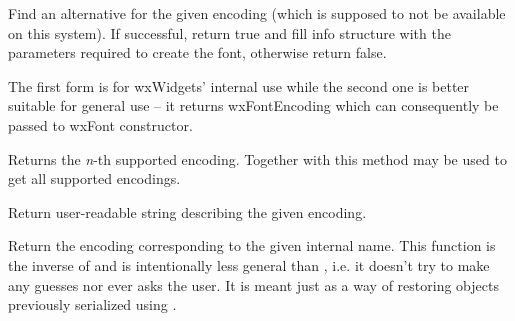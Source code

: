 \label{wxfontmappergetaltforencoding}



Find an alternative for the given encoding (which is supposed to not be
available on this system). If successful, return true and fill info
structure with the parameters required to create the font, otherwise
return false.

The first form is for wxWidgets' internal use while the second one
is better suitable for general use -- it returns wxFontEncoding which
can consequently be passed to wxFont constructor.


\label{wxfontmappergetencoding}


Returns the {\it n}-th supported encoding. Together with 
this method may be used to get all supported encodings.


\label{wxfontmappergetencodingdescription}


Return user-readable string describing the given encoding.


\label{wxfontmappergetencodingfromname}


Return the encoding corresponding to the given internal name. This function is
the inverse of  and is
intentionally less general than 
, i.e. it doesn't
try to make any guesses nor ever asks the user. It is meant just as a way of
restoring objects previously serialized using 
.


